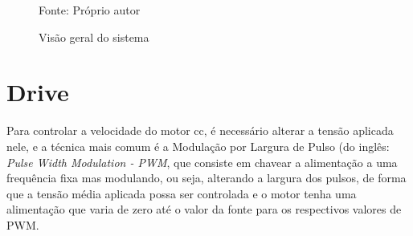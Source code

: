 \begin{figure}[!htb]
\center
\caption{Visão geral do sistema }

{ \small Fonte: Próprio autor}
\end{figure}





\section{Drive}

Para controlar a velocidade do motor cc, 
é necessário alterar a tensão aplicada nele, 
e a técnica mais comum é a 
Modulação por Largura de Pulso (do inglês: \emph{Pulse Width Modulation - PWM}, %
que consiste em chavear a alimentação a uma frequência fixa mas modulando, 
ou seja, alterando a largura dos pulsos, 
de forma que a tensão média aplicada possa ser controlada e 
o motor tenha uma alimentação que varia de zero até o valor da fonte 
para os respectivos valores de PWM.

